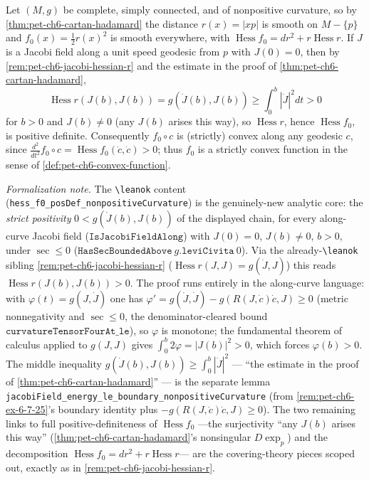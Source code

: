 \begin{remark}
  \label{rem:pet-ch6-hessian-f0-positive-definite}
  \leanok
  Let $(M,g)$ be complete, simply connected, and of nonpositive curvature, so
  by \cref{thm:pet-ch6-cartan-hadamard} the distance $r(x)=|xp|$ is smooth on
  $M-\{p\}$ and $f_0(x)=\tfrac12r(x)^2$ is smooth everywhere, with
  $\operatorname{Hess}f_0=dr^2+r\operatorname{Hess}r$. If $J$ is a Jacobi field along a unit
  speed geodesic from $p$ with $J(0)=0$, then by
  \cref{rem:pet-ch6-jacobi-hessian-r} and the estimate in the proof of
  \cref{thm:pet-ch6-cartan-hadamard},
  \[
    \operatorname{Hess}r(J(b),J(b))=g(\dot J(b),J(b))\ge\int_0^b|\dot J|^2dt>0
  \]
  for $b>0$ and $J(b)\ne0$ (any $J(b)$ arises this way), so $\operatorname{Hess}r$, hence
  $\operatorname{Hess}f_0$, is positive definite. Consequently $f_0\circ c$ is (strictly)
  convex along any geodesic $c$, since
  $\frac{d^2}{dt^2}f_0\circ c=\operatorname{Hess}f_0(\dot c,\dot c)>0$; thus $f_0$ is a
  strictly convex function in the sense of
  \cref{def:pet-ch6-convex-function}.

  \emph{Formalization note.} The \texttt{\textbackslash leanok} content
  (\texttt{hess\_f0\_posDef\_nonpositiveCurvature}) is the genuinely-new analytic
  core: the \emph{strict positivity} $0<g(\dot J(b),J(b))$ of the displayed chain,
  for every along-curve Jacobi field ($\texttt{IsJacobiFieldAlong}$) with $J(0)=0$,
  $J(b)\ne0$, $b>0$, under $\sec\le0$ ($\texttt{HasSecBoundedAbove}\ g.\texttt{leviCivita}\ 0$).
  Via the already-\texttt{\textbackslash leanok} sibling
  \cref{rem:pet-ch6-jacobi-hessian-r} ($\operatorname{Hess}r(J,J)=g(\dot J,J)$) this
  reads $\operatorname{Hess}r(J(b),J(b))>0$. The proof runs entirely in the
  along-curve language: with $\varphi(t)=g(J,\dot J)$ one has
  $\varphi'=g(\dot J,\dot J)-g(R(J,\dot c)\dot c,J)\ge0$ (metric nonnegativity and
  $\sec\le0$, the denominator-cleared bound
  $\texttt{curvatureTensorFourAt\_le}$), so $\varphi$ is monotone; the fundamental
  theorem of calculus applied to $g(J,J)$ gives $\int_0^b2\varphi=|J(b)|^2>0$, which
  forces $\varphi(b)>0$. The middle inequality
  $g(\dot J(b),J(b))\ge\int_0^b|\dot J|^2$ — ``the estimate in the proof of
  \cref{thm:pet-ch6-cartan-hadamard}'' — is the separate lemma
  \texttt{jacobiField\_energy\_le\_boundary\_nonpositiveCurvature} (from
  \cref{rem:pet-ch6-ex-6-7-25}'s boundary identity plus $-g(R(J,\dot c)\dot c,J)\ge0$).
  The two remaining links to full positive-definiteness of $\operatorname{Hess}f_0$
  ---the surjectivity ``any $J(b)$ arises this way'' (\cref{thm:pet-ch6-cartan-hadamard}'s
  nonsingular $D\exp_p$) and the decomposition $\operatorname{Hess}f_0=dr^2+r\operatorname{Hess}r$---
  are the covering-theory pieces scoped out, exactly as in
  \cref{rem:pet-ch6-jacobi-hessian-r}.
\end{remark}

